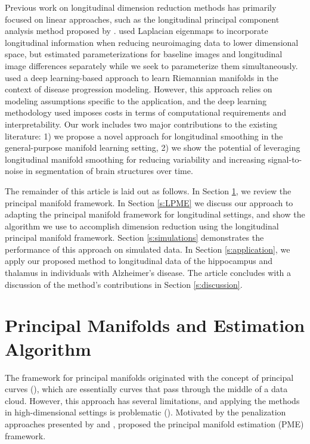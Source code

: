 \documentclass[11pt,reqno]{article}
\theoremstyle{definition}
\begin{document}
Previous work on longitudinal dimension reduction methods has primarily focused on linear approaches, such as the longitudinal principal component analysis method proposed by \cite{kinsonLongitudinalPrincipalComponent2020}. \cite{wolzManifoldLearningBiomarker2010a} used Laplacian eigenmaps to incorporate longitudinal information when reducing neuroimaging data to lower dimensional space, but estimated parameterizations for baseline images and longitudinal image differences separately while we seek to parameterize them simultaneously. \cite{louisRiemannianGeometryLearning2019} used a deep learning-based approach to learn Riemannian manifolds in the context of disease progression modeling. However, this approach relies on modeling assumptions specific to the application, and the deep learning methodology used imposes costs in terms of computational requirements and interpretability. Our work includes two major contributions to the existing literature: 1) we propose a novel approach for longitudinal smoothing in the general-purpose manifold learning setting, 2) we show the potential of leveraging longitudinal manifold smoothing for reducing variability and increasing signal-to-noise in segmentation of brain structures over time.

The remainder of this article is laid out as follows. In Section \ref{s:PME}, we review the principal manifold framework. In Section \ref{s:LPME} we discuss our approach to adapting the principal manifold framework for longitudinal settings, and show the algorithm we use to accomplish dimension reduction using the longitudinal principal manifold framework. Section \ref{s:simulations} demonstrates the performance of this approach on simulated data. In Section \ref{s:application}, we apply our proposed method to longitudinal data of the hippocampus and thalamus in individuals with Alzheimer's disease. The article concludes with a discussion of the method's contributions in Section \ref{s:discussion}.








\section{Principal Manifolds and Estimation Algorithm}\label{s:PME}

The framework for principal manifolds originated with the concept of principal curves (\cite{hastiePrincipalCurves1989}), which are essentially curves that pass through the middle of a data cloud. However, this approach has several limitations, and applying the methods in high-dimensional settings is problematic (\cite{duchamp1996extremal}). Motivated by the penalization approaches presented by \cite{kegl2000learning} and \cite{smolaRegularizedPrincipalManifolds2001}, \cite{mengPrincipalManifoldEstimation2021} proposed the principal manifold estimation (PME) framework.
\end{document}
